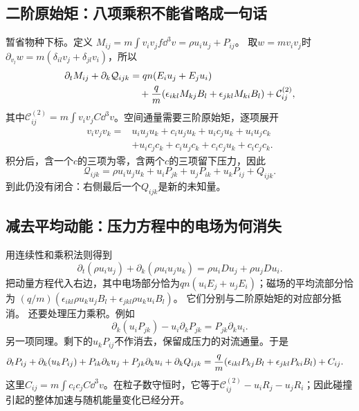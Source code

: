 \documentclass[UTF8,a4paper,11pt,openany,fontset=fandol]{ctexbook}
\begin{document}
\subsection{二阶原始矩：八项乘积不能省略成一句话}
暂省物种下标。定义
$M_{ij}=m\int v_iv_jf\dd^3v=\rho u_iu_j+P_{ij}$。
取$w=mv_iv_j$时
$\partial_{v_l}w=m(\delta_{il}v_j+\delta_{jl}v_i)$，所以
\begin{align}
 \partial_tM_{ij}+\partial_k\mathcal Q_{ijk}
 &=qn(E_iu_j+E_ju_i)\\
 &\quad+{q\over m}
 (\epsilon_{ikl}M_{kj}B_l+\epsilon_{jkl}M_{ki}B_l)
 +\mathcal C^{(2)}_{ij},\nonumber
\end{align}
其中$\mathcal C^{(2)}_{ij}=m\int v_iv_jC\dd^3v$。空间通量需要三阶原始矩，逐项展开
\begin{align}
 v_iv_jv_k={}&u_iu_ju_k
 +c_iu_ju_k+u_ic_ju_k+u_iu_jc_k\\
 &+u_ic_jc_k+c_iu_jc_k+c_ic_ju_k+c_ic_jc_k.\nonumber
\end{align}
积分后，含一个$c$的三项为零，含两个$c$的三项留下压力，因此
\begin{equation}
 \mathcal Q_{ijk}
 =\rho u_iu_ju_k+u_iP_{jk}+u_jP_{ik}+u_kP_{ij}+Q_{ijk}.
 \label{eq:tutorial-rawthird}
\end{equation}
到此仍没有闭合：右侧最后一个$Q_{ijk}$是新的未知量。

\subsection{减去平均动能：压力方程中的电场为何消失}
用连续性和乘积法则得到
\begin{equation}
 \partial_t(\rho u_iu_j)+\partial_k(\rho u_iu_ju_k)
 =\rho u_iDu_j+\rho u_jDu_i.
\end{equation}
把动量方程代入右边，其中电场部分恰为$qn(u_iE_j+u_jE_i)$；磁场的平均流部分恰为
$(q/m)(\epsilon_{ikl}\rho u_ku_jB_l+\epsilon_{jkl}\rho u_ku_iB_l)$。
它们分别与二阶原始矩的对应部分抵消。
还要处理压力乘积。例如
\begin{equation}
 \partial_k(u_iP_{jk})-u_i\partial_kP_{jk}
 =P_{jk}\partial_ku_i.
\end{equation}
另一项同理。剩下的$u_kP_{ij}$不作消去，保留成压力的对流通量。于是
\begin{align}
 \partial_tP_{ij}+\partial_k(u_kP_{ij})
 +P_{ik}\partial_ku_j+P_{jk}\partial_ku_i+\partial_kQ_{ijk}
 ={}&{q\over m}(\epsilon_{ikl}P_{kj}B_l+\epsilon_{jkl}P_{ki}B_l)
 +C_{ij}.
 \label{eq:pressure}
\end{align}
这里$C_{ij}=m\int c_ic_jC\dd^3v$。在粒子数守恒时，它等于$\mathcal C^{(2)}_{ij}-u_iR_j-u_jR_i$；因此碰撞引起的整体加速与随机能量变化已经分开。
\end{document}
